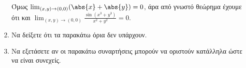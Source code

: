 \documentclass[a4paper,table]{report}
\begin{document}
\begin{enumerate}
\begin{myitemize}
\begin{solution}
          Όμως $ \lim_{(x,y) \to (0,0)} (\abs{x} + \abs{y}) = 0 $, 
          άρα από γνωστό θεώρημα έχουμε ότι και $ \lim_{(x,y) \to (0,0)}
          \frac{\sin{(x^{3}+y^{3})}}{x^{2}+y^{2}} = 0 $.
        \end{solution}
    \end{myitemize}

  \item Να δείξετε ότι τα παρακάτω όρια δεν υπάρχουν.


\item Να εξετάσετε αν οι παρακάτω συναρτήσεις μπορούν να οριστούν κατάλληλα ώστε να 
  είναι συνεχείς.


\end{enumerate}
\end{document}
